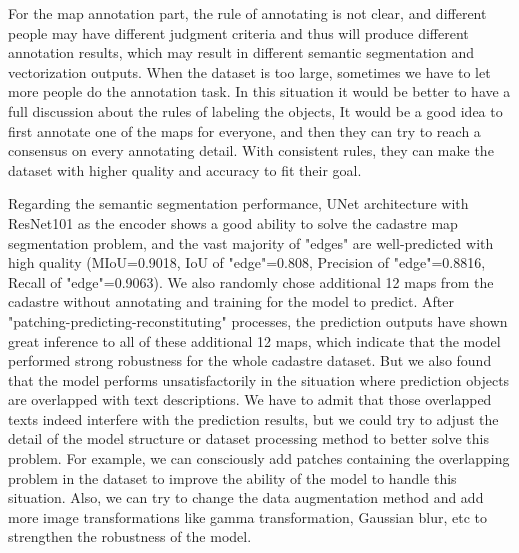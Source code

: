 \documentclass[12pt]{article}
\begin{document}
For the map annotation part, the rule of annotating is not clear, and different people may have different judgment criteria and thus will produce different annotation results, which may result in different semantic segmentation and vectorization outputs. When the dataset is too large, sometimes we have to let more people do the annotation task. In this situation it would be better to have a full discussion about the rules of labeling the objects, It would be a good idea to first annotate one of the maps for everyone, and then they can try to reach a consensus on every annotating detail. With consistent rules, they can make the dataset with higher quality and accuracy to fit their goal. 

Regarding the semantic segmentation performance, UNet architecture with ResNet101 as the encoder shows a good ability to solve the cadastre map segmentation problem, and the vast majority of "edges" are well-predicted with high quality (MIoU=0.9018, IoU of "edge"=0.808, Precision of "edge"=0.8816, Recall of "edge"=0.9063). We also randomly chose additional 12 maps from the cadastre without annotating and training for the model to predict. After "patching-predicting-reconstituting" processes, the prediction outputs have shown great inference to all of these additional 12 maps, which indicate that the model performed strong robustness for the whole cadastre dataset. But we also found that the model performs unsatisfactorily in the situation where prediction objects are overlapped with text descriptions. We have to admit that those overlapped texts indeed interfere with the prediction results, but we could try to adjust the detail of the model structure or dataset processing method to better solve this problem. For example, we can consciously add patches containing the overlapping problem in the dataset to improve the ability of the model to handle this situation. Also, we can try to change the data augmentation method and add more image transformations like gamma transformation, Gaussian blur, etc to strengthen the robustness of the model. 
\end{document}
